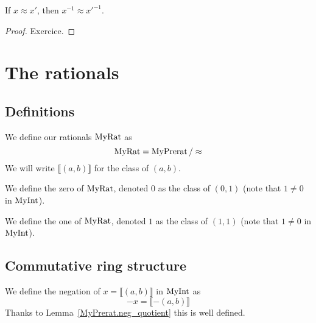 \begin{lemma}
    \label{MyPrerat.inv_quotient}
    \leanok
If $x \approx x'$, then $x^{-1} \approx x'^{-1}$.
\end{lemma}
\begin{proof}
\leanok
Exercice.
\end{proof}

\section{The rationals}

\subsection{Definitions}

\begin{definition}
    \label{MyRat}
    \leanok
    We define our rationals $\mathrm{MyRat}$ as
\[
\mathrm{MyRat} = \mathrm{MyPrerat} \, / \approx
\]
We will write $\llbracket (a, b) \rrbracket$ for the class of $(a,b)$.
\end{definition}

\begin{definition}
    \label{MyRat.zero}
    \leanok
We define the zero of $\mathrm{MyRat}$, denoted $0$ as the class of $(0,1)$ (note that $1 \neq 0$ in $\mathrm{MyInt}$).
\end{definition}

\begin{definition}
    \label{MyRat.one}
    \leanok
We define the one of $\mathrm{MyRat}$, denoted $1$ as the class of $(1,1)$ (note that $1 \neq 0$ in $\mathrm{MyInt}$).
\end{definition}

\subsection{Commutative ring structure}

\begin{definition}
    \label{MyRat.neg}
    \leanok
We define the negation of $x = \llbracket (a, b) \rrbracket$ in $\mathrm{MyInt}$ as
\[
-x = \llbracket -(a, b) \rrbracket
\]
Thanks to Lemma~\ref{MyPrerat.neg_quotient} this is well defined.
\end{definition}

